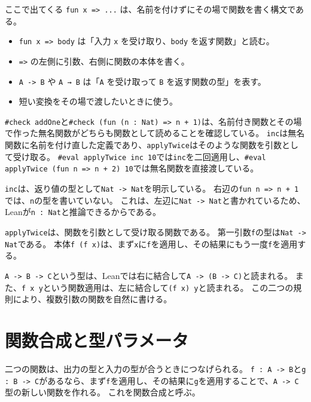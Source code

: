\begin{syntaxbox}
ここで出てくる \texttt{fun x => ...} は、名前を付けずにその場で関数を書く構文である。
\begin{itemize}
\item \texttt{fun x => body} は「入力 \texttt{x} を受け取り、\texttt{body} を返す関数」と読む。
\item \texttt{=>} の左側に引数、右側に関数の本体を書く。
\item \texttt{A -> B} や \texttt{A → B} は「\texttt{A} を受け取って \texttt{B} を返す関数の型」を表す。
\item 短い変換をその場で渡したいときに使う。
\end{itemize}
\end{syntaxbox}


\texttt{\#check addOne}と\texttt{\#check (fun (n : Nat) => n + 1)}は、名前付き関数とその場で作った無名関数がどちらも関数として読めることを確認している。
\texttt{inc}は無名関数に名前を付け直した定義であり、\texttt{applyTwice}はそのような関数を引数として受け取る。
\texttt{\#eval applyTwice inc 10}では\texttt{inc}を二回適用し、\texttt{\#eval applyTwice (fun n => n + 2) 10}では無名関数を直接渡している。

\texttt{inc}は、返り値の型として\texttt{Nat -> Nat}を明示している。
右辺の\texttt{fun n => n + 1}では、\texttt{n}の型を書いていない。
これは、左辺に\texttt{Nat -> Nat}と書かれているため、Leanが\texttt{n : Nat}と推論できるからである。

\texttt{applyTwice}は、関数を引数として受け取る関数である。
第一引数\texttt{f}の型は\texttt{Nat -> Nat}である。
本体\texttt{f (f x)}は、まず\texttt{x}に\texttt{f}を適用し、その結果にもう一度\texttt{f}を適用する。

\begin{leanbox}
\texttt{A -> B -> C}という型は、Leanでは右に結合して\texttt{A -> (B -> C)}と読まれる。
また、\texttt{f x y}という関数適用は、左に結合して\texttt{(f x) y}と読まれる。
この二つの規則により、複数引数の関数を自然に書ける。
\end{leanbox}

\section{関数合成と型パラメータ}

二つの関数は、出力の型と入力の型が合うときにつなげられる。
\texttt{f : A -> B}と\texttt{g : B -> C}があるなら、まず\texttt{f}を適用し、その結果に\texttt{g}を適用することで、\texttt{A -> C}型の新しい関数を作れる。
これを関数合成と呼ぶ。

